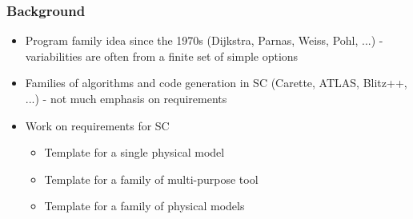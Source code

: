 \documentclass[t,12pt,numbers,fleqn]{beamer}
\begin{document}

\begin{frame}
\frametitle{Background}

\begin{itemize}

\item Program family idea since the 1970s (Dijkstra, Parnas, Weiss, Pohl, ...) - variabilities are often from a finite
set of simple options \cite{Parnas1976, Parnas1979, Dijkstra1972}
\item Families of algorithms and code generation in SC (Carette, ATLAS, Blitz++, ...) - not much emphasis on
requirements \cite{Carette2006, WhaleyEtAl2001, Veldhuizen1998, Blitz2010}
\item Work on requirements for SC
\begin{itemize}
\item Template for a single physical model \cite{SmithEtAl2007, SmithAndLai2005}
\item Template for a family of multi-purpose tool \cite{Smith2006,
    SmithAndChen2004, SmithAndChen2004b}
\item Template for a family of physical models
  \cite{SmithMcCutchanAndCarette2017, SmithEtAl2008, McCutchan2007}
\end{itemize}
\end{itemize}

\end{frame}

\end{document}
